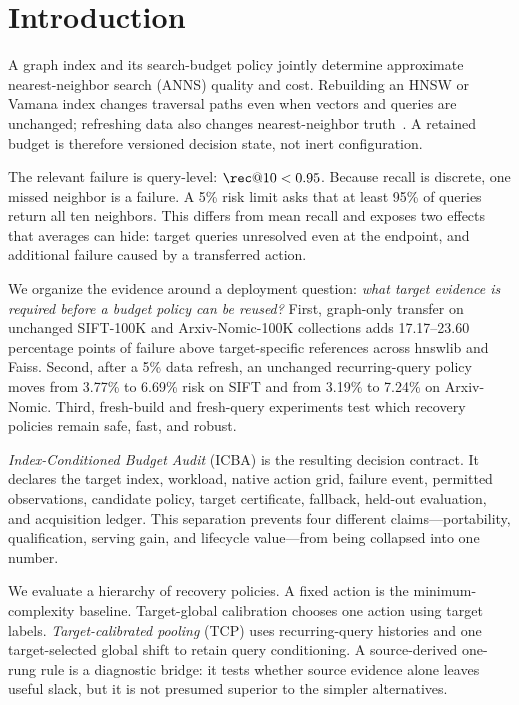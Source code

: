 \section{Introduction}
\label{sec:intro}

A graph index and its search-budget policy jointly determine approximate nearest-neighbor search (ANNS) quality and cost. Rebuilding an HNSW or Vamana index changes traversal paths even when vectors and queries are unchanged; refreshing data also changes nearest-neighbor truth~\cite{malkov2020hnsw,subramanya2019diskann}. A retained budget is therefore versioned decision state, not inert configuration.

The relevant failure is query-level: $\rec@10<0.95$. Because recall is discrete, one missed neighbor is a failure. A 5\% risk limit asks that at least 95\% of queries return all ten neighbors. This differs from mean recall and exposes two effects that averages can hide: target queries unresolved even at the endpoint, and additional failure caused by a transferred action.

We organize the evidence around a deployment question: \emph{what target evidence is required before a budget policy can be reused?} First, graph-only transfer on unchanged SIFT-100K and Arxiv-Nomic-100K collections adds 17.17--23.60 percentage points of failure above target-specific references across hnswlib and Faiss. Second, after a 5\% data refresh, an unchanged recurring-query policy moves from 3.77\% to 6.69\% risk on SIFT and from 3.19\% to 7.24\% on Arxiv-Nomic. Third, fresh-build and fresh-query experiments test which recovery policies remain safe, fast, and robust.

\emph{Index-Conditioned Budget Audit} (ICBA) is the resulting decision contract. It declares the target index, workload, native action grid, failure event, permitted observations, candidate policy, target certificate, fallback, held-out evaluation, and acquisition ledger. This separation prevents four different claims---portability, qualification, serving gain, and lifecycle value---from being collapsed into one number.

We evaluate a hierarchy of recovery policies. A fixed action is the minimum-complexity baseline. Target-global calibration chooses one action using target labels. \emph{Target-calibrated pooling} (TCP) uses recurring-query histories and one target-selected global shift to retain query conditioning. A source-derived one-rung rule is a diagnostic bridge: it tests whether source evidence alone leaves useful slack, but it is not presumed superior to the simpler alternatives.

